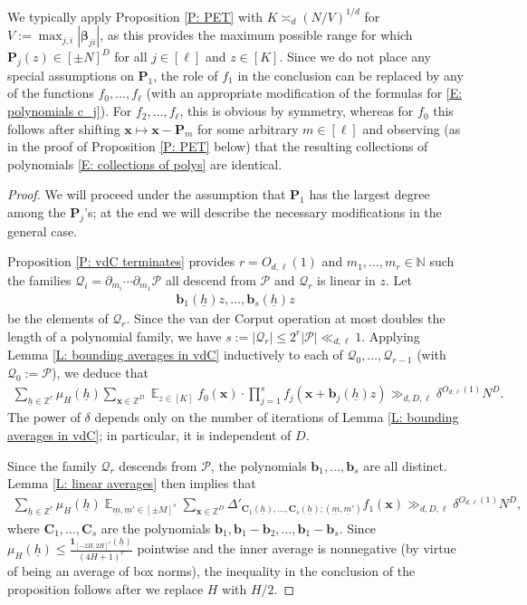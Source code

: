 \documentclass[11pt]{amsart}
\theoremstyle{definition}
\DeclareMathOperator*{\E}{\mathbb{E}}
\newcommand{\N}{{\mathbb N}}
\newcommand{\Z}{{\mathbb Z}}
\newcommand{\CP}{{\mathcal P}}
\newcommand{\CQ}{{\mathcal Q}}
\renewcommand{\b}{{\textbf{b}}}
\newcommand{\bc}{{\textbf{C}}}
\newcommand{\bp}{{\textbf{P}}}
\newcommand{\p}{{\textbf{P}}}
\newcommand{\bx}{{\textbf{x}}}
\newcommand{\bbeta}{{\boldsymbol{\beta}}}
\newcommand{\uh}{{\underline{h}}}
\newcommand{\um}{{\underline{m}}}
\begin{document}
We typically apply Proposition \ref{P: PET} with $K\asymp_d (N/V)^{1/d}$ for $V := \max_{j,i}|\bbeta_{ji}|$, as this provides the maximum possible range for which $\bp_j(z)\in[\pm N]^D$ for all $j\in[\ell]$ and $z\in[K]$. Since we do not place any special assumptions on $\p_1$, the role of $f_1$ in the conclusion can be replaced by any of the functions $f_0, \ldots, f_\ell$ (with an appropriate modification of the formulas for \eqref{E: polynomials c_j}). For $f_2, \ldots, f_\ell$, this is obvious by symmetry, whereas for $f_0$ this follows after shifting $\bx \mapsto\bx - \bp_m$ for some arbitrary $m\in[\ell]$ and observing (as in the proof of Proposition \ref{P: PET} below) that the resulting collections of polynomials \eqref{E: collections of polys} are identical. 


  
  \begin{proof}
      We will proceed under the assumption that $\p_1$ has the largest degree among the $\p_j$'s; at the end we will describe the necessary modifications in the general case. 
      
      Proposition  \ref{P: vdC terminates} provides $r=O_{d,\ell}(1)$ and $m_1, \ldots, m_r\in\N$ such the families $\CQ_i = \partial_{m_i}\cdots\partial_{m_1}\CP$ all descend from $\CP$ and $\CQ_r$ is linear in $z$.  Let 
      \begin{align*}
            \b_{1}(\uh)z, \ldots, \b_{s}(\uh)z   
      \end{align*}
       be the elements of $\CQ_r$. Since the van der Corput operation at most doubles the length of a polynomial family, we have $s := |\CQ_{r}|\leq 2^{r}|\CP|\ll_{d, \ell} 1$. Applying Lemma \ref{L: bounding averages in vdC} inductively to each of $\CQ_0, \ldots, \CQ_{r-1}$ (with $\CQ_0 := \CP$), we deduce that 
    \begin{align*}
        \sum_{\uh\in\Z^r}\mu_H(\uh) {\sum_{\bx\in\Z^D} \E_{z\in[K]}
        f_0(\bx)\cdot \prod_{j=1}^s f_j(\bx + \b_{j}(\uh)z) }\gg_{d, D, \ell} \delta^{O_{d, \ell}(1)} N^D.
    \end{align*}
The power of $\delta$ depends only on the number of iterations of Lemma \ref{L: bounding averages in vdC}; in particular, it is independent of $D$.
    
    Since the family $\CQ_r$ descends from $\CP$, the polynomials $\b_{1}, \ldots, \b_{s}$ are all distinct. Lemma \ref{L: linear averages} then implies that
       \begin{align*}
       \sum_{\uh\in\Z^{r}}\mu_H(\uh) \E_{\um, \um'\in[\pm M]^s}
       \sum_{\bx\in\Z^D}\Delta'_{{\bc_1(\uh)}, \ldots, {\bc_s(\uh)}; (\um, \um')} f_1(\bx) \gg_{d, D, \ell} \delta^{O_{d, \ell}(1)} N^D,
   \end{align*}
   where $\bc_1, \ldots, \bc_s$ are the polynomials $\b_{1}, \b_{1}-\b_{2}, \ldots, \b_{1} - \b_{s}$. Since $\mu_H(\uh)\leq \frac{\mathbf{1}_{[-2H,2H]^r}(\uh)}{(4H+1)^r}$ pointwise and the inner average is nonnegative (by virtue of being an average of box norms), the inequality in the conclusion of the proposition follows after we replace $H$ with $H/2$.
    

\end{proof}
\end{document}
